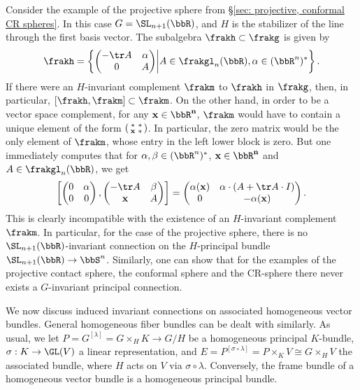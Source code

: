 \begin{example}\label{ex 1.4.6(2) Cap}
    Consider the example of the projective sphere from \S\ref{sec: projective, conformal CR spheres}. In this case $G=\SL_{n+1}(\bbR)$, and $H$ is the stabilizer of the line through the first basis vector. The subalgebra $\frakh\subset \frakg$ is given by 
    \[\frakh=\left\{\begin{pmatrix}-\tr A& \alpha\\ 0&A\end{pmatrix}\middle| A\in\frakgl_n(\bbR),\alpha\in(\bbR^n)^\ast\right\}.\]
    If there were an $H$-invariant complement $\frakm$ to $\frakh$ in $\frakg$, then, in particular, $[\frakh,\frakm]\subset\frakm$. On the other hand, in order to be a vector space complement, for any $\bf{x}\in\bbR^n$, $\frakm$ would have to contain a unique element of the form $\left(\begin{smallmatrix}
        \ast &\ast\\\bf{x}&\ast
    \end{smallmatrix}\right)$. In particular, the zero matrix would be the only element of $\frakm$, whose entry in the left lower block is zero. But one immediately computes that for $\alpha,\beta\in(\bbR^n)^\ast$, $\bf{x}\in\bbR^n$ and $A\in\frakgl_n(\bbR)$, we get 
    \[\left[\begin{pmatrix}
        0&\alpha\\0&0
    \end{pmatrix},
    \begin{pmatrix}
        -\tr A&\beta\\
        \bf{x}&A
    \end{pmatrix}
    \right]
    =
    \begin{pmatrix}
        \alpha(\bf{x})& \alpha\cdot (A+\tr A\cdot I)\\
        0& -\alpha(\bf{x})
    \end{pmatrix}.
    \]
    This is clearly incompatible with the existence of an $H$-invariant complement $\frakm$. In particular, for the case of the projective sphere, there is no $\SL_{n+1}(\bbR)$-invariant connection on the $H$-principal bundle $\SL_{n+1}(\bbR)\to \bbS^n$. Similarly, one can show that for the examples of the projective contact sphere, the conformal sphere and the CR-sphere there never exists a $G$-invariant principal connection.
\end{example}






We now discuss induced invariant connections on associated homogeneous vector bundles. General homogeneous fiber bundles can be dealt with similarly. As usual, we let $P=G^{[\lambda]}=G\times_H K\to G\slash H$ be a homogeneous principal $K$-bundle, $\sigma:K\to \GL(V)$ a linear representation, and $E=P^{[\sigma\circ\lambda]}=P\times_K V\cong G\times_H V$ the associated bundle, where $H$ acts on $V$ via $\sigma\circ\lambda$. Conversely, the frame bundle of a homogeneous vector bundle is a homogeneous principal bundle. 

